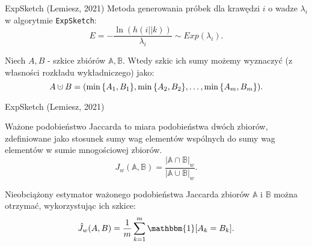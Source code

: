 \begin{frame}[squeeze]{ExpSketch (Lemiesz, 2021)}
    Metoda generowania próbek dla krawędzi $i$ o wadze $\lambda_i$ w algorytmie \texttt{ExpSketch}:
    \[
        E = - \frac{\ln(h(i || k))}{\lambda_i} \sim Exp(\lambda_i).
    \]

    \begin{twierdzenie}
        Niech $A, B$ - szkice zbiórów $\mathbb{A}, \mathbb{B}$. Wtedy szkic ich sumy możemy wyznaczyć (z własności rozkładu wykładniczego) jako:
        \[
            A \mathbin{\mathaccent\cdot\cup} B = (\min{\{A_1, B_1\}}, \min{\{A_2, B_2\}}, \dots, \min{\{A_m, B_m\}}).
        \]
    \end{twierdzenie}

\end{frame}

\begin{frame}[squeeze]{ExpSketch (Lemiesz, 2021)}
    \begin{definicja}
        Ważone podobieństwo Jaccarda to miara podobieństwa dwóch zbiorów, zdefiniowane jako stosunek sumy wag elementów wspólnych do sumy wag elementów w sumie mnogościowej zbiorów.
        \[
            J_w(\mathbb{A}, \mathbb{B}) = \frac{|\mathbb{A} \cap \mathbb{B}|_w}{|\mathbb{A} \cup \mathbb{B}|_w}.
        \]
    \end{definicja}

    \begin{twierdzenie}
        Nieobciążony estymator ważonego podobieństwa Jaccarda zbiorów $\mathbb{A}$ i $\mathbb{B}$ można otrzymać, wykorzystując ich szkice:
        \[
            \hat{J}_w(A, B) = \frac{1}{m} \sum\limits_{k = 1}^{m} \mathbbm{1}[A_k = B_k].  
        \]
    \end{twierdzenie}
\end{frame}